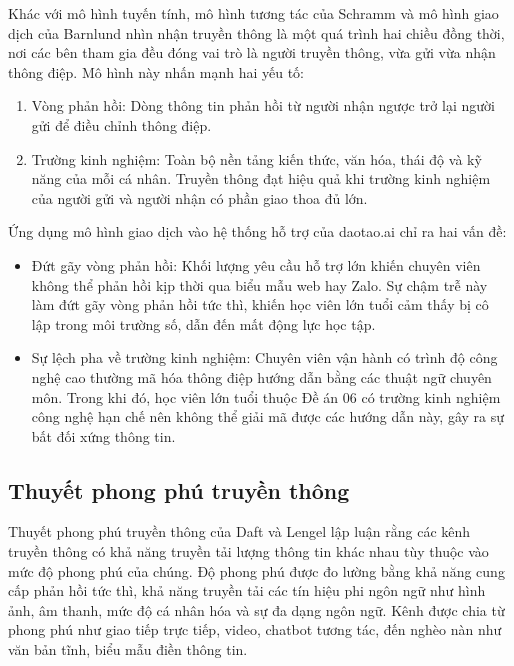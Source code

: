 Khác với mô hình tuyến tính, mô hình tương tác của Schramm \parencite{schramm1954} và mô hình giao dịch của Barnlund \parencite{barnlund2008} nhìn nhận truyền thông là một quá trình hai chiều đồng thời, nơi các bên tham gia đều đóng vai trò là người truyền thông, vừa gửi vừa nhận thông điệp. Mô hình này nhấn mạnh hai yếu tố:
\begin{enumerate}
    \item Vòng phản hồi: Dòng thông tin phản hồi từ người nhận ngược trở lại người gửi để điều chỉnh thông điệp.
    \item Trường kinh nghiệm: Toàn bộ nền tảng kiến thức, văn hóa, thái độ và kỹ năng của mỗi cá nhân. Truyền thông đạt hiệu quả khi trường kinh nghiệm của người gửi và người nhận có phần giao thoa đủ lớn.
\end{enumerate}

Ứng dụng mô hình giao dịch vào hệ thống hỗ trợ của daotao.ai chỉ ra hai vấn đề:
\begin{itemize}
    \item Đứt gãy vòng phản hồi: Khối lượng yêu cầu hỗ trợ lớn khiến chuyên viên không thể phản hồi kịp thời qua biểu mẫu web hay Zalo. Sự chậm trễ này làm đứt gãy vòng phản hồi tức thì, khiến học viên lớn tuổi cảm thấy bị cô lập trong môi trường số, dẫn đến mất động lực học tập.
    \item Sự lệch pha về trường kinh nghiệm: Chuyên viên vận hành có trình độ công nghệ cao thường mã hóa thông điệp hướng dẫn bằng các thuật ngữ chuyên môn. Trong khi đó, học viên lớn tuổi thuộc Đề án 06 có trường kinh nghiệm công nghệ hạn chế nên không thể giải mã được các hướng dẫn này, gây ra sự bất đối xứng thông tin.
\end{itemize}

\subsection{Thuyết phong phú truyền thông}

Thuyết phong phú truyền thông của Daft và Lengel \parencite{daft1986} lập luận rằng các kênh truyền thông có khả năng truyền tải lượng thông tin khác nhau tùy thuộc vào mức độ phong phú của chúng. Độ phong phú được đo lường bằng khả năng cung cấp phản hồi tức thì, khả năng truyền tải các tín hiệu phi ngôn ngữ như hình ảnh, âm thanh, mức độ cá nhân hóa và sự đa dạng ngôn ngữ. Kênh được chia từ phong phú như giao tiếp trực tiếp, video, chatbot tương tác, đến nghèo nàn như văn bản tĩnh, biểu mẫu điền thông tin.


